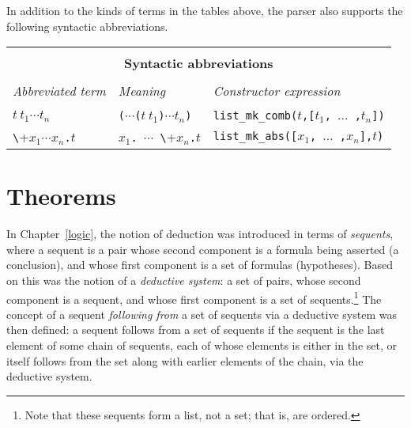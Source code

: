 In addition to the kinds of terms in the tables above, the parser also
supports the following syntactic abbreviations.


\begin{center}

\begin{tabular}{|l|l|l|} \hline
\multicolumn{3}{|c|}{ } \\
\multicolumn{3}{|c|}{\bf Syntactic abbreviations} \\
\multicolumn{3}{|c|}{ } \\
{\it Abbreviated term} & {\it Meaning} &
{\it Constructor expression} \\ \hline
 & &  \\
$t\ t_1 \cdots t_n$ &
{\small\verb+(+}$\cdots${\small\verb+(+}$t\ t_1${\small\verb+)+}$\cdots t_n${\small\verb+)+} &
{\small\verb+list_mk_comb(+}$t${\small\verb+,[+}$t_1${\small\verb+, +}$\ldots${\small\verb+ ,+}$t_n${\small\verb+])+} \\ \hline
{\small\verb+\+}$x_1\cdots x_n${\small\verb+.+}$t$ &
\holtxt{\bs}$x_1${\small\verb+. +}$\cdots${\small\verb+ \+}$x_n${\small\verb+.+}$t$ &
{\small\verb+list_mk_abs([+}$x_1${\small\verb+, +}$\ldots${\small\verb+ ,+}$x_n${\small\verb+],+}$t${\small\verb+)+}
\\ \hline
\end{tabular}
\end{center}


\section{Theorems}
\label{sec:theorems-in-ml}

In Chapter~\ref{logic}, the notion of deduction was introduced in
terms of \textit{sequents},
%
%
where a sequent is a pair whose second component is a formula being
asserted (a conclusion),
%
%
and whose first component is a set of formulas
(hypotheses).
%
%
Based on this was the notion of a \textit{deductive
  system}:
%
a set of pairs, whose second component is a sequent, and whose first
component is a set of sequents.\footnote{Note that these sequents form
  a list, not a set; that is, are ordered.}  The concept of a sequent
\textit{following from}
%
%
a set of sequents via a deductive system was then defined: a sequent
follows from a set of sequents if the sequent is the last element of
some chain of sequents, each of whose elements is either in the set,
or itself follows from the set along with earlier elements of the
chain, via the deductive system.

